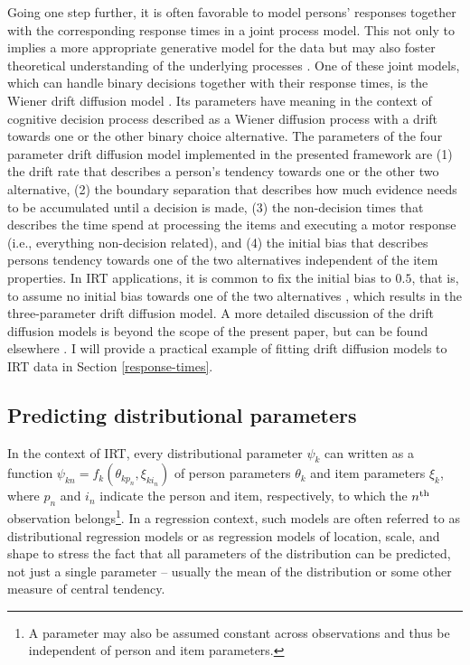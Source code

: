 \documentclass[jss]{jss}
\begin{document}
Going one step further, it is often favorable to model persons'
responses together with the corresponding response times in a joint
process model. This not only to implies a more appropriate generative
model for the data but may also foster theoretical understanding of the
underlying processes \citep{ratcliff1978, vandermaas2011}. One of these
joint models, which can handle binary decisions together with their
response times, is the Wiener drift diffusion model
\citep{ratcliff1978, vandermaas2011}. Its parameters have meaning in the
context of cognitive decision process described as a Wiener diffusion
process with a drift towards one or the other binary choice alternative.
The parameters of the four parameter drift diffusion model implemented
in the presented framework are (1) the drift rate that describes a
person's tendency towards one or the other two alternative, (2) the
boundary separation that describes how much evidence needs to be
accumulated until a decision is made, (3) the non-decision times that
describes the time spend at processing the items and executing a motor
response (i.e., everything non-decision related), and (4) the initial
bias that describes persons tendency towards one of the two alternatives
independent of the item properties. In IRT applications, it is common to
fix the initial bias to \(0.5\), that is, to assume no initial bias
towards one of the two alternatives \citep{diffIRT}, which results in
the three-parameter drift diffusion model. A more detailed discussion of
the drift diffusion models is beyond the scope of the present paper, but
can be found elsewhere \citep{ratcliff1978, vandermaas2011, diffIRT}. I
will provide a practical example of fitting drift diffusion models to
IRT data in Section \ref{response-times}.

\hypertarget{predDP}{%
\subsection{Predicting distributional parameters}\label{predDP}}

In the context of IRT, every distributional parameter \(\psi_k\) can
written as a function \(\psi_{kn} = f_k(\theta_{kp_n}, \xi_{ki_n})\) of
person parameters \(\theta_{k}\) and item parameters \(\xi_{k}\), where
\(p_n\) and \(i_n\) indicate the person and item, respectively, to which
the \(n\textsuperscript{th}\) observation
belongs\footnote{A parameter may also be assumed constant across observations
and thus be independent of person and item parameters.}. In a regression
context, such models are often referred to as distributional regression
models or as regression models of location, scale, and shape
\citep{rigby2005} to stress the fact that all parameters of the
distribution can be predicted, not just a single parameter -- usually
the mean of the distribution or some other measure of central tendency.
\end{document}
